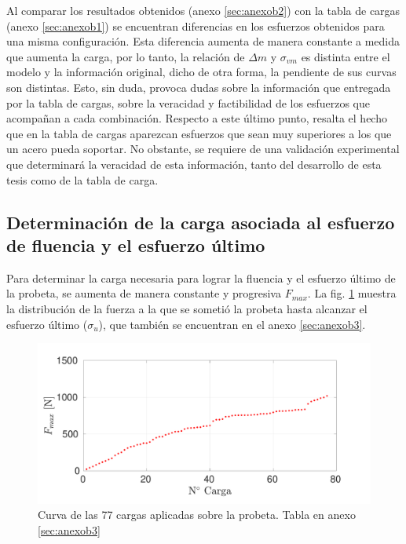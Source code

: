 Al comparar los resultados obtenidos (anexo \ref{sec:anexob2}) con la tabla de cargas (anexo \ref{sec:anexob1}) se encuentran diferencias en los esfuerzos obtenidos para una misma configuración. Esta diferencia aumenta de manera constante a medida que aumenta la carga, por lo tanto, la relación de $\Delta m$ y $\sigma_{vm}$ es distinta entre el modelo y la información original, dicho de otra forma, la pendiente de sus curvas son distintas. Esto, sin duda, provoca dudas sobre la información que entregada por la tabla de cargas, sobre la veracidad y factibilidad de los esfuerzos que acompañan a cada combinación. Respecto a este último punto, resalta el hecho que en la tabla de cargas aparezcan esfuerzos que sean muy superiores a los que un acero pueda soportar. No obstante, se requiere de una validación experimental que determinará la veracidad de esta información, tanto del desarrollo de esta tesis como de la tabla de carga.

\newpage

\subsection{Determinación de la carga asociada al esfuerzo de fluencia y el esfuerzo último}

Para determinar la carga necesaria para lograr la fluencia y el esfuerzo último de la probeta, se aumenta de manera constante y progresiva $F_{max}$. La fig. \ref{fig:f_step} muestra la distribución de la fuerza a la que se sometió la probeta hasta alcanzar el esfuerzo último ($\sigma_u$), que también se encuentran en el anexo \ref{sec:anexob3}.

\begin{figure}[h]
\centering
\includegraphics[width=1\linewidth, trim={0cm 0cm 1cm 0cm}, clip]{Imagenes/f_step.pdf}
\caption{Curva de las 77 cargas aplicadas sobre la probeta. Tabla en anexo \ref{sec:anexob3}}
\label{fig:f_step}
\end{figure}

